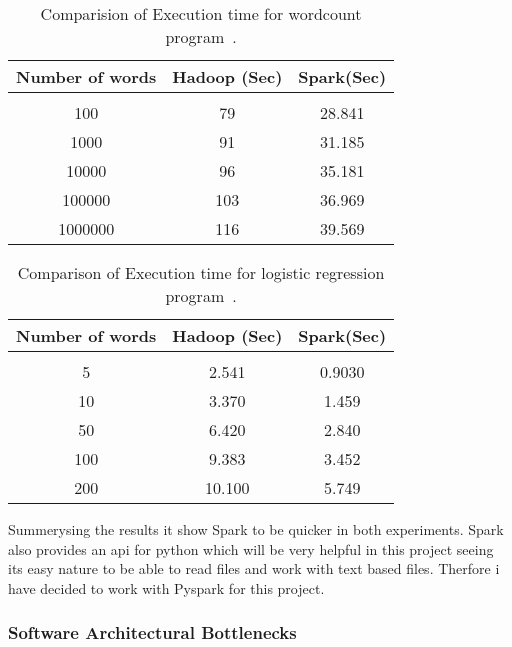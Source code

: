 \documentclass{report}
\begin{document}
\begin{table}[h!]
    \begin{center}
    \label{tab:Amino acids}
        \begin{tabular}{c|cc}
        Number of words & Hadoop (Sec) & Spark(Sec)\\
        \hline
        \\
        100 & 79 & 28.841
        \\
        1000 & 91 & 31.185
        \\
        10000 & 96 & 35.181
        \\
        100000 & 103 & 36.969
        \\
        1000000 & 116 & 39.569
        \end{tabular}
        \caption{\label{Results1}Comparision of Execution time for wordcount program~\cite{hazarika_performance_2017}.}
    \end{center}
\end{table}

\begin{table}[h!]
    \begin{center}
    \label{tab:Amino acids}
        \begin{tabular}{c|cc}
        Number of words & Hadoop (Sec) & Spark(Sec)\\
        \hline
        \\
        5 & 2.541 & 0.9030
        \\
        10 & 3.370 & 1.459
        \\
        50 & 6.420 & 2.840
        \\
        100 & 9.383 & 3.452
        \\
        200 & 10.100 & 5.749 
        \end{tabular}
        \caption{\label{Results1}Comparison of Execution time for logistic
        regression program~\cite{hazarika_performance_2017}.}
    \end{center}
\end{table}

Summerysing the results it show Spark to be quicker in both experiments. Spark also provides an api for python which will be very helpful in this project seeing its easy nature to be able to read files and work with text based files. Therfore i have decided to work with Pyspark for this project.

\subsubsection{Software Architectural Bottlenecks}
\end{document}
